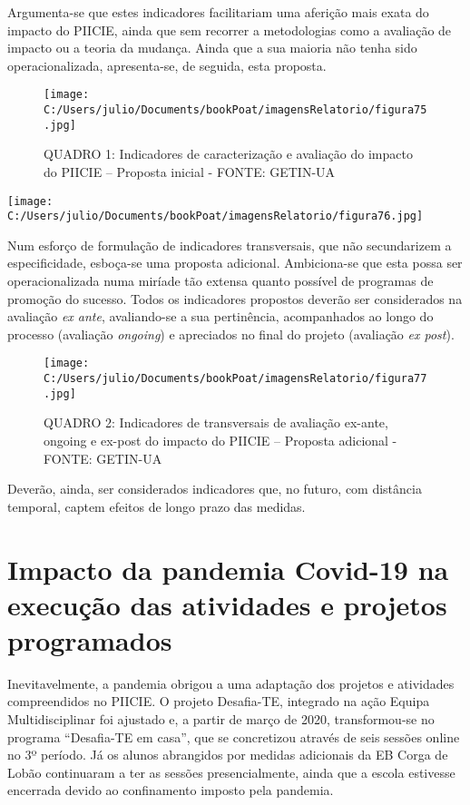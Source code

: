 \documentclass[
]{book}
\begin{document}
Argumenta-se que estes indicadores facilitariam uma aferição mais exata do impacto do PIICIE, ainda que sem recorrer a metodologias como a avaliação de impacto ou a teoria da mudança. Ainda que a sua maioria não tenha sido operacionalizada, apresenta-se, de seguida, esta proposta.

\begin{figure}
\centering
\texttt{[image: C:/Users/julio/Documents/bookPoat/imagensRelatorio/figura75.jpg]}
\caption{QUADRO 1: Indicadores de caracterização e avaliação do impacto do PIICIE -- Proposta inicial - FONTE: GETIN-UA}
\end{figure}

\texttt{[image: C:/Users/julio/Documents/bookPoat/imagensRelatorio/figura76.jpg]}

Num esforço de formulação de indicadores transversais, que não secundarizem a especificidade, esboça-se uma proposta adicional. Ambiciona-se que esta possa ser operacionalizada numa miríade tão extensa quanto possível de programas de promoção do sucesso. Todos os indicadores propostos deverão ser considerados na avaliação \emph{ex ante}, avaliando-se a sua pertinência, acompanhados ao longo do processo (avaliação \emph{ongoing}) e apreciados no final do projeto (avaliação \emph{ex post}).

\begin{figure}
\centering
\texttt{[image: C:/Users/julio/Documents/bookPoat/imagensRelatorio/figura77.jpg]}
\caption{QUADRO 2: Indicadores de transversais de avaliação ex-ante, ongoing e ex-post do impacto do PIICIE -- Proposta adicional - FONTE: GETIN-UA}
\end{figure}

Deverão, ainda, ser considerados indicadores que, no futuro, com distância temporal, captem efeitos de longo prazo das medidas.

\hypertarget{impacto-da-pandemia-covid-19-na-execuuxe7uxe3o-das-atividades-e-projetos-programados}{%
\section{\texorpdfstring{\textbf{Impacto da pandemia Covid-19 na execução das atividades e projetos programados}}{Impacto da pandemia Covid-19 na execução das atividades e projetos programados}}\label{impacto-da-pandemia-covid-19-na-execuuxe7uxe3o-das-atividades-e-projetos-programados}}

Inevitavelmente, a pandemia obrigou a uma adaptação dos projetos e atividades compreendidos no PIICIE. O projeto Desafia-TE, integrado na ação Equipa Multidisciplinar foi ajustado e, a partir de março de 2020, transformou-se no programa ``Desafia-TE em casa'', que se concretizou através de seis sessões online no 3º período. Já os alunos abrangidos por medidas adicionais da EB Corga de Lobão continuaram a ter as sessões presencialmente, ainda que a escola estivesse encerrada devido ao confinamento imposto pela pandemia.
\end{document}
